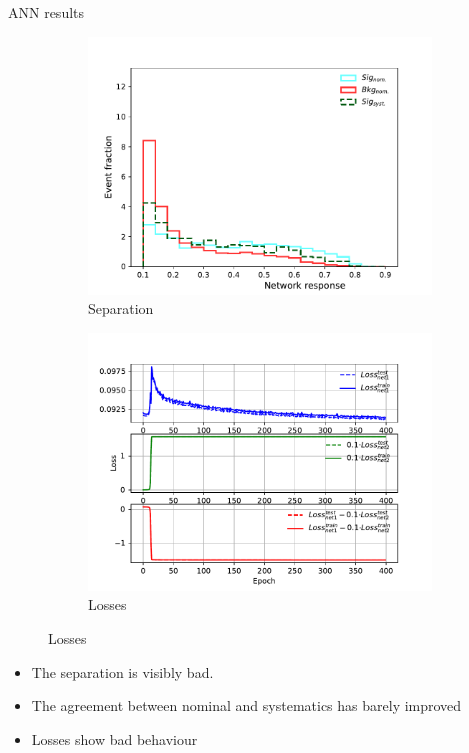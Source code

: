 \documentclass[10pt, UKenglish]{beamer}
\begin{document}
\begin{frame}{ANN results}
\begin{figure}[htbp]
    \centering
    \begin{subfigure}[b]{0.4\textwidth}
		\includegraphics[width=\textwidth]{app2_syst.pdf}
		\caption{Separation}
		\label{fig:simple:final:roc}
	\end{subfigure}
\quad
	\begin{subfigure}[b]{0.4\textwidth}
		\includegraphics[width=\textwidth]{app2_losses2.pdf}
		\caption{Losses}
		\label{fig:simple:final:loss}
	\end{subfigure}
\end{figure}
\begin{itemize}
\item The separation is visibly bad.
\item The agreement between nominal and systematics has barely improved
\item Losses show bad behaviour
\end{itemize}
\end{frame}
\end{document}
